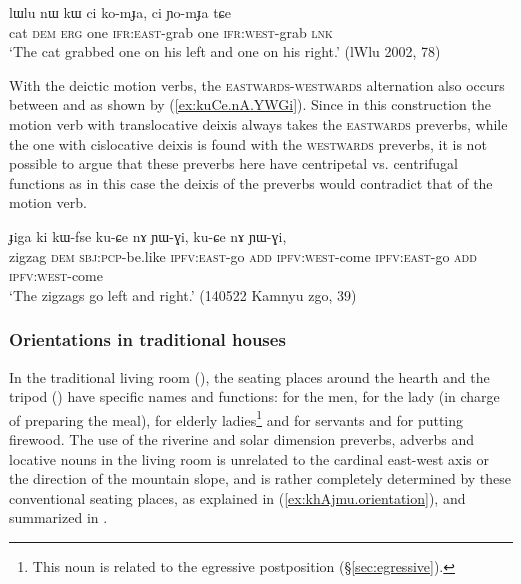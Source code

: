 \begin{exe}
\ex \label{ex:komJA.YomJa}
\gll   lɯlu nɯ kɯ ci ko-mɟa, ci ɲo-mɟa tɕe  \\
 cat \textsc{dem} \textsc{erg} one \textsc{ifr}:\textsc{east}-grab one \textsc{ifr}:\textsc{west}-grab \textsc{lnk}  \\
\glt `The cat grabbed one on his left and one on his right.' (lWlu 2002, 78)
\end{exe} 
 
With the deictic motion verbs, the \textsc{eastwards}-\textsc{westwards} alternation also occurs between  and   as shown by (\ref{ex:kuCe.nA.YWGi}). Since in this construction the motion verb with translocative deixis always takes the \textsc{eastwards} preverbs, while the one with cislocative deixis is found with the \textsc{westwards} preverbs, it is not possible to argue that these preverbs here have centripetal vs. centrifugal functions as in this case the deixis of the preverbs would contradict that of the motion verb.
 
 \begin{exe}
\ex \label{ex:kuCe.nA.YWGi}
\gll ɟiga ki kɯ-fse ku-ɕe nɤ ɲɯ-ɣi, ku-ɕe nɤ ɲɯ-ɣi,  \\
zigzag \textsc{dem} \textsc{sbj}:\textsc{pcp}-be.like \textsc{ipfv}:\textsc{east}-go \textsc{add} \textsc{ipfv}:\textsc{west}-come \textsc{ipfv}:\textsc{east}-go \textsc{add} \textsc{ipfv}:\textsc{west}-come \\ 
\glt `The zigzags go left and right.' (140522 Kamnyu zgo, 39)
\end{exe} 

\subsubsection{Orientations in traditional houses}  \label{sec:orientation.kitchen}
In the traditional living room (), the seating places around the hearth and the tripod () have specific names and functions:  for the men,  for the lady (in charge of preparing the meal),  for elderly ladies\footnote{This noun is related to the egressive postposition  (§\ref{sec:egressive}). } and  for servants and for putting firewood. The use of the riverine and solar dimension preverbs, adverbs and locative nouns in the living room is unrelated to the cardinal east-west axis or the direction of the mountain slope, and is rather completely determined by these conventional seating places, as explained in (\ref{ex:khAjmu.orientation}), and summarized in .

